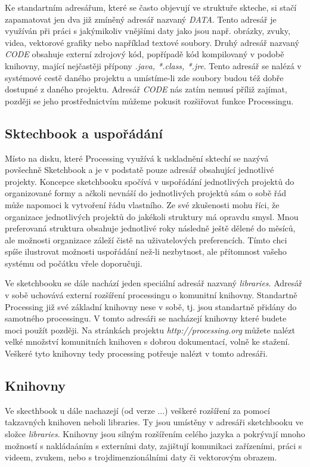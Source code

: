\documentclass[11pt]{article}
\begin{document}
Ke standartním adresářum, které se často objevují ve struktuře skteche, si stačí zapamatovat jen dva již zmíněný adresář nazvaný {\em DATA}. Tento adresář je využíván při práci s jakýmikoliv vnějšími daty jako jsou např. obrázky, zvuky, videa, vektorové grafiky nebo například textové soubory. Druhý adresář nazvaný {\em CODE} obsahuje externí zdrojový kód, popřípadě kód kompilovaný v podobě knihovny, mající nejčastěji přípony {\em *.java, *.class, *.jre}. Tento adresář se nalézá v systémové cestě daného projektu a umístíme-li zde soubory budou též dobře dostupné z daného projektu. Adresář {\em CODE} nás zatím nemusí příliž zajímat, později se jeho prostřednictvím můžeme pokusit rozšiřovat funkce Processingu.

\subsection{Sktechbook a uspořádání}

Místo na disku, které Processing využívá k uskladnění sktechí se nazývá povšechně Sketchbook a je v podstatě pouze adresář obsahující jednotlivé projekty. Koncepce sketchbooku spočívá v uspořádání jednotlivých projektů do organizované formy a ačkoli nevnáší do jednotlivých projektů sám o sobě řád může napomoci k vytvoření řádu vlastního. Ze své zkušenosti mohu říci, že organizace jednotlivých projektů do jakékoli struktury má opravdu smysl. Mnou preferovaná struktura obsahuje jednotlivé roky následně ještě dělené do měsíců, ale možnosti organizace záleží čistě na uživatelových preferencích. Tímto chci spíše ilustrovat možnosti uspořádání než-li nezbytnost, ale přítomnost vašeho systému od počátku vřele doporučuji.

Ve sketchbooku se dále nachází jeden speciální adresář nazvaný {\em libraries}. Adresář v sobě uchovává externí rozšíření processingu o komunitní knihovny. Standartně Processing již své základní knihovny nese v sobě, tj. jsou standartně přidány do samotného processingu. V tomto adresáři se nacházejí knihovny které budete moci použít později. Na stránkách projektu {\em http://processing.org} můžete nalézt velké množství komunitních knihoven s dobrou dokumentací, volně ke stažení. Veškeré tyto knihovny tedy processing potřeuje nalézt v tomto adresáři.

\subsection{Knihovny}

Ve skecthbook u dále nachazejí (od verze ...) veškeré rozšíření za pomocí takzavných knihoven neboli libraries. Ty jsou umístěny v adresáři sketchbooku ve složce {\em libraries}. Knihovny jsou silným rozšířením celého jazyka a pokrývají mnoho možností s nakládaáním s externími daty, zajištují komunikaci zařízeními, práci s videem, zvukem, nebo s trojdimenzionálními daty či vektorovým obrazem.
\end{document}
